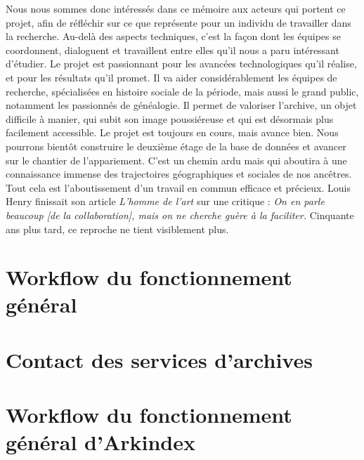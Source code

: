 \documentclass[a4paper,12pt,twoside]{book}
\begin{document}
 Nous nous sommes donc intéressés dans ce mémoire aux acteurs qui portent ce projet, afin de réfléchir sur ce que représente pour un individu de travailler dans la recherche. Au-delà des aspects techniques, c’est la façon dont les équipes se coordonnent, dialoguent et travaillent entre elles qu’il nous a paru intéressant d’étudier. Le projet est passionnant pour les avancées technologiques qu’il réalise, et pour les résultats qu’il promet. Il va aider considérablement les équipes de recherche, spécialisées en histoire sociale de la période, mais aussi le grand public, notamment les passionnés de généalogie. Il permet de valoriser l’archive, un objet difficile à manier, qui subit son image poussiéreuse et qui est désormais plus facilement accessible. Le projet est toujours en cours, mais avance bien. Nous pourrons bientôt construire le deuxième étage de la base de données et avancer sur le chantier de l’appariement. C’est un chemin ardu mais qui aboutira à une connaissance immense des trajectoires géographiques et sociales de nos ancêtres. Tout cela est l’aboutissement d’un travail en commun efficace et précieux. Louis Henry finissait son article \textit{L’homme de l’art} sur une critique : \textit{On en parle beaucoup [de la collaboration], mais on ne cherche guère à la faciliter.} Cinquante ans plus tard, ce reproche ne tient visiblement plus. 
\newpage{\pagestyle{empty}\cleardoublepage}


\appendix %

\chapter[Fonctionnement Général - Workflow]{Workflow du fonctionnement général}


\chapter[Contacter les services d'archives - Workflow]{Contact des services d'archives}


\chapter[Fonctionnement Général d'Arkindex - Workflow]{Workflow du fonctionnement général d'Arkindex}

\end{document}
